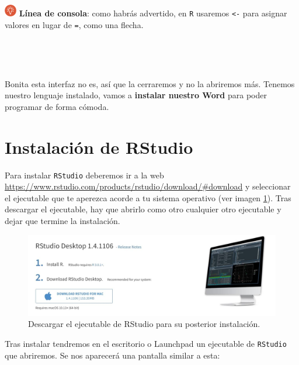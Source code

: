 \documentclass[11pt,]{book}
\begin{document}
\includegraphics[width=0.04\textwidth,height=\textheight]{img/logo_info.png} \textbf{Línea de consola}: como habrás advertido, en \texttt{R} usaremos \texttt{\textless{}-} para asignar valores en lugar de \texttt{=}, como una flecha.

~

~

Bonita esta interfaz no es, así que la cerraremos y no la abriremos más. Tenemos nuestro lenguaje instalado, vamos a \textbf{instalar nuestro Word} para poder programar de forma cómoda.

\hypertarget{instalacionRStudio}{%
\section{Instalación de RStudio}\label{instalacionRStudio}}

Para instalar \texttt{RStudio} deberemos ir a la web \url{https://www.rstudio.com/products/rstudio/download/\#download} y seleccionar el ejecutable que te aperezca acorde a tu sistema operativo (ver imagen \ref{fig:pantalla-rstudio}). Tras descargar el ejecutable, hay que abrirlo como otro cualquier otro ejecutable y dejar que termine la instalación.

\begin{figure}

{\centering \includegraphics[width=0.75\linewidth]{./img/pantalla_rstudio} 

}

\caption{Descargar el ejecutable de RStudio para su posterior instalación.}\label{fig:pantalla-rstudio}
\end{figure}

Tras instalar tendremos en el escritorio o Launchpad un ejecutable de \texttt{RStudio} que abriremos. Se nos aparecerá una pantalla similar a esta:
\end{document}
